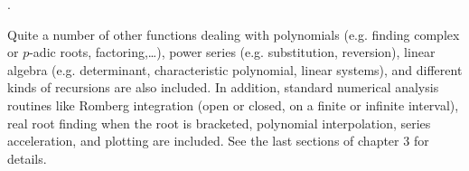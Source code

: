 .

Quite a number of other functions dealing with polynomials (e.g. finding
complex or $p$-adic roots, factoring,\dots), power series
(e.g. substitution, reversion),
linear algebra (e.g. determinant, characteristic polynomial, linear
systems), and different kinds of recursions are also included. In addition,
standard numerical analysis routines like Romberg integration (open or closed,
on a finite or infinite interval), real root finding when the root is bracketed,
polynomial interpolation, series acceleration, and plotting are included.
See the last sections of chapter 3 for details.

\vfill\eject









